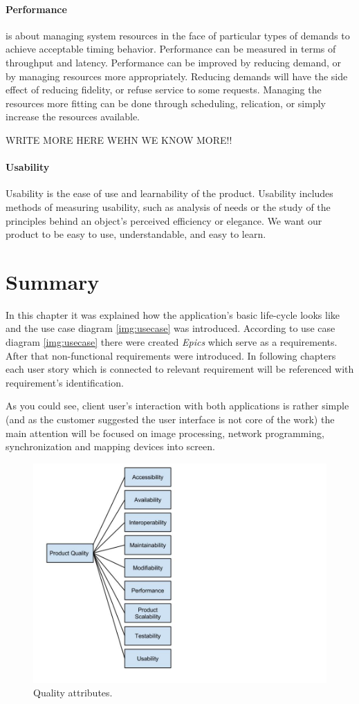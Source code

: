 \paragraph{Performance}
is about managing system resources in the face of particular types of demands to achieve acceptable timing behavior. 
Performance can be measured in terms of throughput and latency. 
Performance can be improved by reducing demand, or by managing resources more appropriately. 
Reducing demands will have the side effect of reducing fidelity, or refuse service to some requests. 
Managing the resources more fitting can be done through scheduling, relication, or simply increase the resources available.

WRITE MORE HERE WEHN WE KNOW MORE!!


\paragraph{Usability}
Usability is the ease of use and learnability of the product.
Usability includes methods of measuring usability, such as analysis of needs or the study of the principles behind an object's perceived efficiency or elegance. We want our product to be easy to use, understandable, and easy to learn.  

\section{Summary}
In this chapter it was explained how the application's basic life-cycle looks like and the use case diagram \ref{img:usecase} was introduced.
According to use case diagram \ref{img:usecase} there were created \emph{Epics} which serve as a requirements. 
After that non-functional requirements were introduced.
In following chapters each user story which is connected to relevant requirement will be referenced with requirement's identification.

As you could see, client user's interaction with both applications is rather simple (and as the customer suggested the user interface is not core of the work) the main attention will be focused on image processing, network programming, synchronization and mapping devices into screen.

\begin{figure}[!ht]
    \begin{center}
    \includegraphics[scale=0.4]{images/qualityAttributes.jpg}
    \caption{Quality attributes.}
    \label{img:qualityAttributes}
    \end{center}
\end{figure}